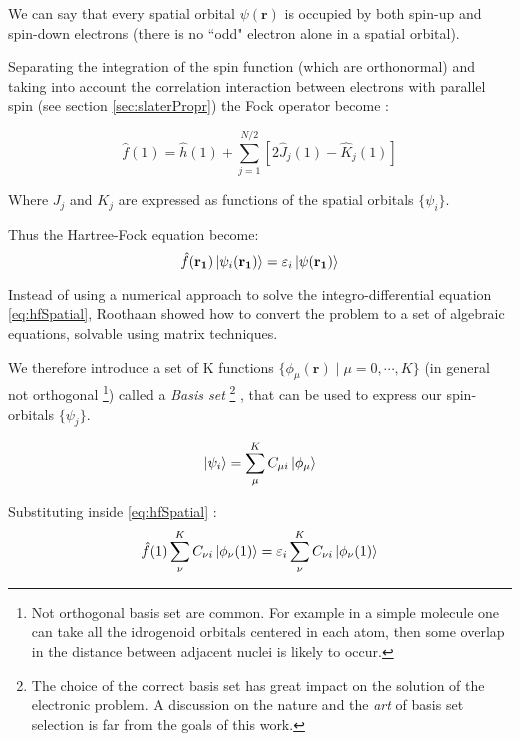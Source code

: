 \documentclass[a4paper,12pt]{article}
\begin{document}
We can say that every spatial orbital $\psi(\mathbf{r})$ is occupied by both spin-up and spin-down electrons (there is no ``odd" electron alone in a spatial orbital).

Separating the integration of the spin function (which are orthonormal) and taking into account the correlation interaction between electrons with parallel spin (see section \ref{sec:slaterPropr}) \cite[p.132-133]{Attila} the Fock operator become :

\begin{equation}
\hat{f}(1) = \hat{h}(1) +\sum_{j=1}^{N/2}[2\hat J_j(1)-\hat K_j(1)]
\end{equation}

Where $J_j$ and $K_j$ are expressed as functions of the spatial orbitals $\{\psi_i\}$.

Thus the Hartree-Fock equation become:
\begin{equation}\label{eq:hfSpatial}
	\hat{f}(\mathbf{r_1}) \ket{\psi_i(\mathbf{r_1})} = \varepsilon_i \ket{\psi(\mathbf{r_1})}
\end{equation}

Instead of using a numerical approach to solve the integro-differential equation \eqref{eq:hfSpatial}, Roothaan showed how to convert the problem to a set of algebraic equations, solvable using matrix techniques.

We therefore introduce a set of K functions $\{ \phi_{\mu}(\mathbf{r}) \mid \mu = 0,\cdots,K\}$ (in general not orthogonal \footnote{Not orthogonal basis set are common. For example in a simple molecule one can take all the idrogenoid orbitals centered in each atom, then some overlap in the distance between adjacent nuclei is likely to occur.}) called a \textit{Basis set} \footnote{ The choice of the correct basis set has great impact on the solution of the electronic problem. A discussion on the nature and the \textit{art} of basis set selection is far from the goals of this work.} , that can be used to express our spin-orbitals $\{\psi_j\}$.

\begin{equation}
	\ket{\psi_i} = \sum_{\mu}^{K} C_{\mu i} \ket{\phi_{\mu}}
\end{equation}

Substituting inside \eqref{eq:hfSpatial} :
\begin{equation}
	\hat{f}(1) \sum_{\nu}^{K} C_{\nu i} \ket{\phi_{\nu}(1)}  = \varepsilon_i \sum_{\nu}^{K} C_{\nu i} \ket{\phi_{\nu}(1)}
\end{equation}
\end{document}
